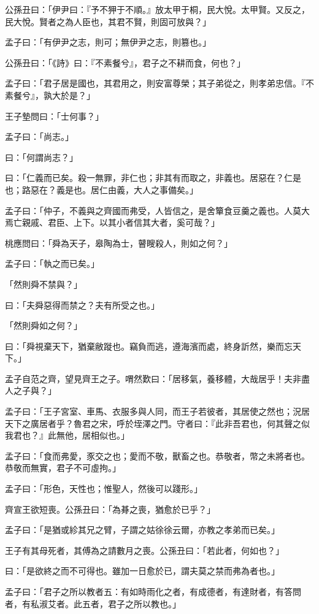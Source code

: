\documentclass[12pt,a4paper]{ctexbook}
\begin{document}
公孫丑曰：「伊尹曰：『予不狎于不順。』放太甲于桐，民大悅。太甲賢。又反之，民大悅。賢者之為人臣也，其君不賢，則固可放與？」\par
孟子曰：「有伊尹之志，則可；無伊尹之志，則篡也。」\par
公孫丑曰：「《詩》曰：『不素餐兮』，君子之不耕而食，何也？」\par
孟子曰：「君子居是國也，其君用之，則安富尊榮；其子弟從之，則孝弟忠信。『不素餐兮』，孰大於是？」\par
王子墊問曰：「士何事？」\par
孟子曰：「尚志。」\par
曰：「何謂尚志？」\par
曰：「仁義而已矣。殺一無罪，非仁也；非其有而取之，非義也。居惡在？仁是也；路惡在？義是也。居仁由義，大人之事備矣。」\par
孟子曰：「仲子，不義與之齊國而弗受，人皆信之，是舍簞食豆羹之義也。人莫大焉亡親戚、君臣、上下。以其小者信其大者，奚可哉？」\par
桃應問曰：「舜為天子，皋陶為士，瞽瞍殺人，則如之何？」\par
孟子曰：「執之而已矣。」\par
「然則舜不禁與？」\par
曰：「夫舜惡得而禁之？夫有所受之也。」\par
「然則舜如之何？」\par
曰：「舜視棄天下，猶棄敝蹝也。竊負而逃，遵海濱而處，終身訢然，樂而忘天下。」\par
孟子自范之齊，望見齊王之子。喟然歎曰：「居移氣，養移體，大哉居乎！夫非盡人之子與？」\par
孟子曰：「王子宮室、車馬、衣服多與人同，而王子若彼者，其居使之然也；況居天下之廣居者乎？魯君之宋，呼於垤澤之門。守者曰：『此非吾君也，何其聲之似我君也？』此無他，居相似也。」\par
孟子曰：「食而弗愛，豕交之也；愛而不敬，獸畜之也。恭敬者，幣之未將者也。恭敬而無實，君子不可虛拘。」\par
孟子曰：「形色，天性也；惟聖人，然後可以踐形。」\par
齊宣王欲短喪。公孫丑曰：「為朞之喪，猶愈於已乎？」\par
孟子曰：「是猶或紾其兄之臂，子謂之姑徐徐云爾，亦教之孝弟而已矣。」\par
王子有其母死者，其傅為之請數月之喪。公孫丑曰：「若此者，何如也？」\par
曰：「是欲終之而不可得也。雖加一日愈於已，謂夫莫之禁而弗為者也。」\par
孟子曰：「君子之所以教者五：有如時雨化之者，有成德者，有達財者，有答問者，有私淑艾者。此五者，君子之所以教也。」\par
\end{document}
